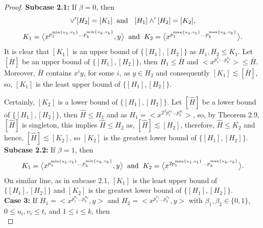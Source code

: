 \documentclass{article}
\theoremstyle{definition}
\begin{document}
\begin{proof}
        \textbf{Subcase 2.1:} If $\beta=0$, then
        \begin{equation*}
            [H_1]\vee' [H_2]=[K_1] \hspace{0.2cm} \text{and }\hspace{0.2cm} [H_1]\wedge' [H_2]=[K_2], 
        \end{equation*}
        \begin{equation*}
            K_1=\bigl<x^{p_1^{\min\{u_1,v_1\}}\dots p_k^{\min\{u_k,v_k\}}},y\bigr> \hspace{0.2cm} \text{and} \hspace{0.2cm} K_2=\bigl<x^{p_1^{\max\{u_1,v_1\}}\dots p_k^{\max\{u_k,v_k\}}}\bigr>.
        \end{equation*}
       It is clear that $[K_1]$ is an upper bound of $\{[H_1],[H_2]\}$ as $H_1,H_2\le K_1$. Let $[\bar H]$ be an upper bound of $\{[H_1],[H_2]\}$, then $H_1\le \bar H$ and $\bigl<x^{{p_1^{v_1}}\dots p_k^{v_k}}\bigr>\le \bar H$. Moreover, $\bar H$ contains $x^iy$, for some $i$, as $y\in H_2$ and consequently $[K_1]\lesssim [\bar H]$, so, $[K_1]$ is the least upper bound of $\{[H_1],[H_2]\}$. \par
       Certainly, $[K_2]$ is a lower bound of $\{[H_1],[H_2]\}$. Let $[\widehat H]$ be a lower bound of $\{[H_1],[H_2]\}$, then $\widehat H\le H_1$ and as $H_1=\bigl<x^{2^\beta p_1^{u_1}\dots p_k^{u_k}}\bigr>$, so, by Theorem 2.9, $[\widehat H]$ is singleton, this implies $\widehat H \le H_2$ as, $[\widehat H]\lesssim [H_2]$, therefore, $\widehat H \le K_2$ and hence, $[\widehat H]\lesssim [K_2]$, so $[K_2]$ is the greatest lower bound of $\{[H_1],[H_2]\}$. \vspace{0.2cm}\\ 
        \textbf{Subcase 2.2:} If $\beta=1$, then
        \begin{equation*}
            K_1=\bigl<x^{p_1^{\min\{u_1,v_1\}}\dots p_k^{\min\{u_k,v_k\}}},y\bigr> \hspace{0.2cm} \text{and} \hspace{0.2cm} K_2=\bigl<x^{2{p_1^{\max\{u_1,v_1\}}\dots p_k^{\max\{u_k,v_k\}}}}\bigr>.
        \end{equation*} 
        On similar line, as in subcase 2.1, $[K_1]$ is the least upper bound of $\{[H_1],[H_2]\}$ and $[K_2]$ is the greatest lower bound of $\{[H_1],[H_2]\}$. \vspace{0.2cm}\\
        \textbf{Case 3:} If $H_1=\bigl<x^{p_1^{u_1}\dots p_k^{u_k}},y\bigr>$ and $H_2=\bigl<x^{p_1^{v_1}\dots p_k^{v_k}},y\bigr>$ with $\beta_1,\beta_2 \in \{0,1\}$, $0\le u_i,v_i\le t_i$ and $1\le i\le k$, then \begin{equation*}

\end{equation*}
\end{proof}
\end{document}
